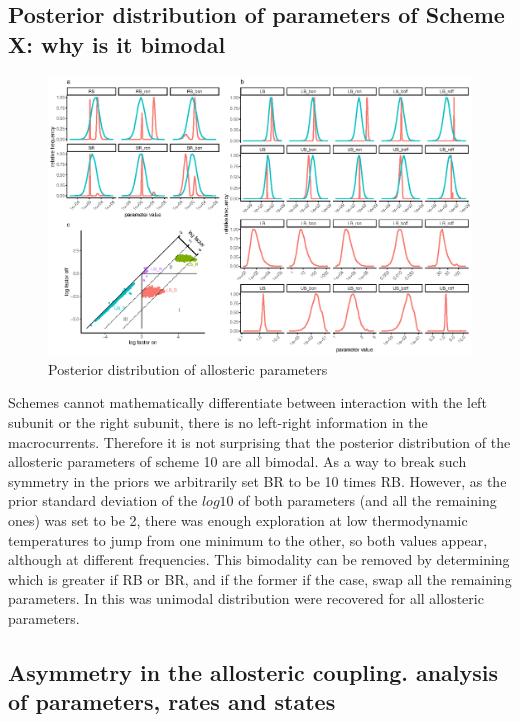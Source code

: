 \documentclass[pdflatex,sn-mathphys-num]{sn-jnl}%
\theoremstyle{thmstyleone}%
\theoremstyle{thmstyletwo}%
\theoremstyle{thmstylethree}%
\begin{document}
\subsection{Posterior distribution of parameters of Scheme X: why is it bimodal}

\begin{figure}[h]
\centering
\includegraphics[width=1.0\textwidth]{Figure_2_ABC.eps}
\caption{Posterior distribution of allosteric parameters}
\label{fig_bimodal}
\end{figure}


Schemes cannot mathematically differentiate between interaction with the left subunit or the right subunit, there is no left-right information in the macrocurrents. Therefore it is not surprising that the posterior distribution of the allosteric parameters of scheme 10 are all bimodal. As a way to break such symmetry in the priors we arbitrarily set BR to be 10 times RB. However, as the prior standard deviation of the $log10$ of both parameters (and all the remaining ones) was set to be 2, there was enough exploration at low thermodynamic temperatures to jump from one minimum to the other, so both values appear, although at different frequencies. 
This bimodality can be removed by determining which is greater if RB or BR, and if the former if the case, swap all the remaining parameters. In this was unimodal distribution were recovered for all allosteric parameters. 

\subsection{Asymmetry in the allosteric coupling. analysis of parameters, rates and states}
\end{document}
